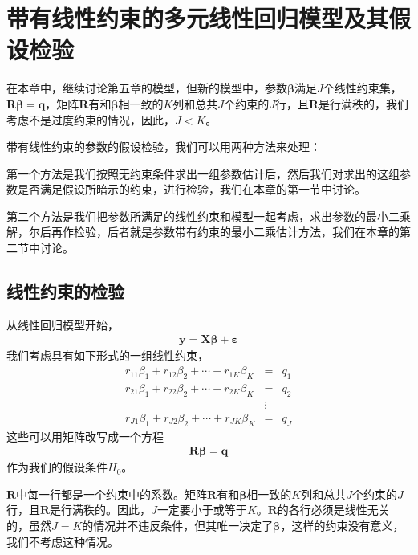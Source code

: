 \chapter{带有线性约束的多元线性回归模型及其假设检验}
	
	在本章中，继续讨论第五章的模型，但新的模型中，参数$ \boldsymbol{\beta} $满足$ J $个线性约束集，$ \boldsymbol{R}\boldsymbol{\beta} = \boldsymbol{q} $，矩阵$ \boldsymbol{R} $有和$ \boldsymbol{\beta} $相一致的$ K $列和总共$ J $个约束的$ J $行，且$ \boldsymbol{R} $是行满秩的，我们考虑不是过度约束的情况，因此，$ J<K $。
	 
	带有线性约束的参数的假设检验，我们可以用两种方法来处理：
	 
	第一个方法是我们按照无约束条件求出一组参数估计后，然后我们对求出的这组参数是否满足假设所暗示的约束，进行检验，我们在本章的第一节中讨论。
	 
	第二个方法是我们把参数所满足的线性约束和模型一起考虑，求出参数的最小二乘解，尔后再作检验，后者就是参数带有约束的最小二乘估计方法，我们在本章的第二节中讨论。
	\section{线性约束的检验}
	从线性回归模型开始，
	\begin{align}
		\boldsymbol{y} = \boldsymbol{X \beta}+\boldsymbol{\varepsilon}
	\end{align}
	我们考虑具有如下形式的一组线性约束，
	\vspace{-0.5em}
	\begin{eqnarray*}
		r_{11} \beta_{1}+r_{12} \beta_{2}+\cdots+r_{1 K} \beta_{K} & = & q_{1} \\
		r_{21} \beta_{1}+r_{22} \beta_{2}+\cdots+r_{2 K} \beta_{K} & = & q_{2} \\
		& \vdots & \\
		r_{J 1} \beta_{1}+r_{J 2} \beta_{2}+\cdots+r_{J K} \beta_{K} & = & q_{J}
	\end{eqnarray*}
	这些可以用矩阵改写成一个方程
	\begin{align}
		\boldsymbol{R \beta} = \boldsymbol{q}	
	\end{align}
	作为我们的假设条件$ H_{0} $。
	
	$ \boldsymbol{R} $中每一行都是一个约束中的系数。矩阵$ \boldsymbol{R} $有和$ \boldsymbol{\beta} $相一致的$ K $列和总共$ J $个约束的$ J $行，且$ \boldsymbol{R} $是行满秩的。因此，$ J $一定要小于或等于$ K $。$ \boldsymbol{R} $的各行必须是线性无关的，虽然$ J = K $的情况并不违反条件，但其唯一决定了$ \boldsymbol{\beta} $，这样的约束没有意义，我们不考虑这种情况。
	
